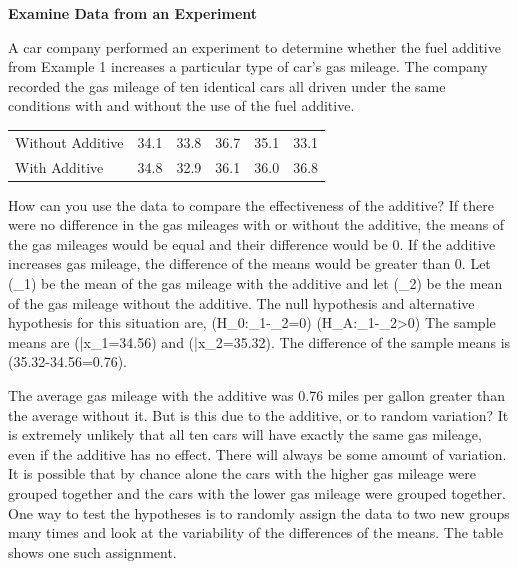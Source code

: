\documentclass{article}
\newenvironment{example}[1]{}{}         %
\newcommand{\placeholder}[2]{}          %
\newcommand{\te}[1]{}                   %
\begin{document}
\begin{example}{2}
\textbf{Examine Data from an Experiment}
\te{APPLICATION}
A car company performed an experiment to determine whether the fuel additive from Example 1 increases a particular type of car's gas mileage.
The company recorded the gas mileage of ten identical cars all driven under the same conditions with and without the use of the fuel additive.
\begin{tabular}{lrrrrr}
Without Additive & 34.1 & 33.8 & 36.7 & 35.1 & 33.1 \\
With Additive & 34.8 & 32.9 & 36.1 & 36.0 & 36.8 \\
\end{tabular}
\placeholder{illustration}{Blue car dashboard display containing the transcribed two-row mileage table. Five green rectangles above each row; time display 8:15 and three buttons below.}
How can you use the data to compare the effectiveness of the additive?
If there were no difference in the gas mileages with or without the additive, the means of the gas mileages would be equal and their difference would be 0. If the additive increases gas mileage, the difference of the means would be greater than 0.
Let (\mu_1) be the mean of the gas mileage with the additive and let (\mu_2) be the mean of the gas mileage without the additive. The null hypothesis and alternative hypothesis for this situation are,
(H_0:\mu_1-\mu_2=0)
(H_A:\mu_1-\mu_2>0)
The sample means are (\bar{x}_1=34.56) and (\bar{x}_2=35.32).
The difference of the sample means is
(35.32-34.56=0.76).
\te{Printed sample subscripts reverse the stated population groups: the With Additive sample has mean 35.32, and Without Additive has mean 34.56.}
\te{Callout: Recall that the notation (\bar{x}) represents the sample mean. Note that the hypotheses use the population mean (\mu).}
The average gas mileage with the additive was 0.76 miles per gallon greater than the average without it. But is this due to the additive, or to random variation?
It is extremely unlikely that all ten cars will have exactly the same gas mileage, even if the additive has no effect. There will always be some amount of variation. It is possible that by chance alone the cars with the higher gas mileage were grouped together and the cars with the lower gas mileage were grouped together.
One way to test the hypotheses is to randomly assign the data to two new groups many times and look at the variability of the differences of the means. The table shows one such assignment.
\begin{tabular}{lrrrrr}

\end{tabular}
\end{example}
\end{document}
